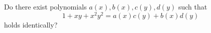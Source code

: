 Do there exist polynomials  $a(x), b(x), c(y), d(y)$  such that
\[
       1 + x y + x^2 y^2 = a(x) c(y) + b(x) d(y)
\]
holds identically?
